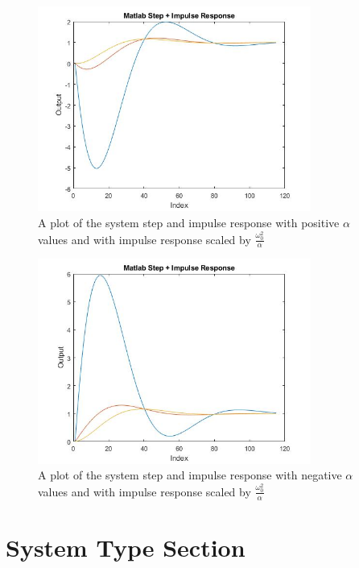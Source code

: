 \begin{figure}[H]
              \centering
              \includegraphics[width=0.8\textwidth]{./figures/lab4_fig6-part4-3-2-matlab-b-negative.jpg}
              \caption{A plot of the system step and impulse response with positive $\alpha$ values and with impulse response scaled by $\frac{\omega^{2}_{0}}{\alpha}$}
              \label{fig:stepimpulse-negative-alpha}
\end{figure}

\begin{figure}[H]
              \centering
              \includegraphics[width=0.8\textwidth]{./figures/lab4_fig6-part4-3-2-matlab-b-positive.jpg}
              \caption{A plot of the system step and impulse response with negative $\alpha$ values and with impulse response scaled by $\frac{\omega^{2}_{0}}{\alpha}$}
              \label{fig:stepimpulse-positive-alpha}
\end{figure}


\section{System Type Section} %

